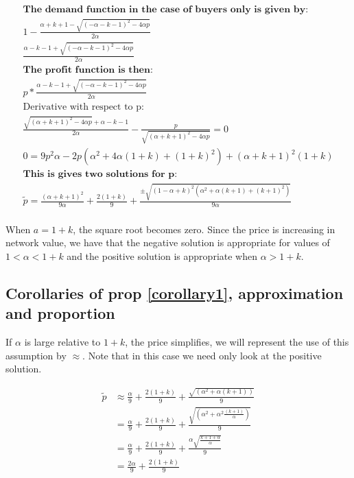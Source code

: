 \documentclass[12pt]{article}
\numberwithin{equation}{section}
\begin{document}
\begin{align*}
\textbf{The demand function in the case of buyers only is given by:} \\
1-\frac{\alpha+k+1-\sqrt{(-\alpha-k-1)^2-4 \alpha p}}{2 \alpha} \\
\frac{\alpha-k-1+\sqrt{(-\alpha-k-1)^2-4 \alpha p}}{2 \alpha}
\\
\textbf{The profit function is then:} 
\\
p*\frac{\alpha-k-1+\sqrt{(-\alpha-k-1)^2-4 \alpha p}}{2 \alpha}
\\
\text{Derivative with respect to p}: \\
\frac{\sqrt{(\alpha+k+1)^2-4 \alpha p}+\alpha-k-1}{2 \alpha}-\frac{p}{\sqrt{(\alpha+k+1)^2-4 \alpha p}} =0
\\
0 = 9 p^2 \alpha  -2 p (\alpha^2 + 4\alpha(1+k)+(1+k)^2) + ( \alpha+k+1)^2 (1+k)
\\
\textbf{This is gives two solutions for p:} \\
\tilde{p} = \frac{(\alpha+k+1)^2}{9 \alpha}+\frac{2(1+k)}{9}+\frac{ \pm \sqrt{(1-\alpha+k)^2(\alpha^2+\alpha (k+1)+(k+1)^2)}}{9 \alpha} \\
\end{align*}

When $a=1+k$, the square root becomes zero. Since the price is increasing in network value, we have that the negative solution is appropriate for values of $1< \alpha <1+k$ and the positive solution is appropriate when $\alpha > 1+k$. 

\subsection{Corollaries of prop \ref{corollary1}, approximation and proportion} \label{corollary1proof}

If $\alpha$ is large relative to $1+k$, the price simplifies, we will represent the use of this assumption by $\approx$. Note that in this case we need only look at the positive solution. 

\begin{align*}
\tilde{p} &\approx \frac{\alpha}{9}+\frac{2(1+k)}{9}+\frac{  \sqrt{(\alpha^2+\alpha (k+1))}}{9 } \\
&=\frac{\alpha}{9}+\frac{2(1+k)}{9}+\frac{  \sqrt{(\alpha^2+\alpha^2 \frac{(k+1)}{\alpha})}}{9 } \\
&=\frac{\alpha}{9}+\frac{2(1+k)}{9}+\frac{  \alpha \sqrt{ \frac{k+1+\alpha}{\alpha}}}{9} \\
&=\frac{2\alpha}{9}+\frac{2(1+k)}{9}
\end{align*}
\end{document}
